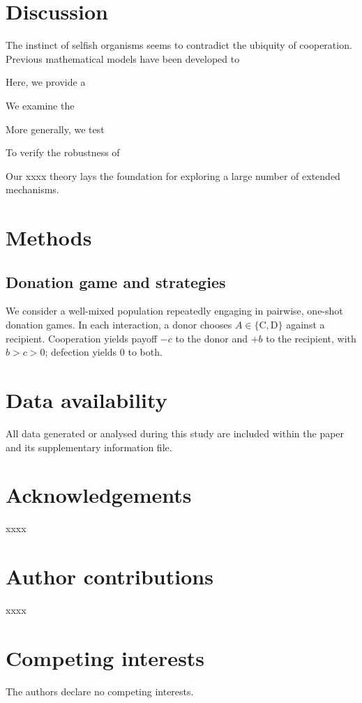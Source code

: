 \documentclass[fleqn,10pt]{wlscirep}
\begin{document}
\section*{Discussion}
The instinct of selfish organisms seems to contradict the ubiquity of cooperation. Previous mathematical models have been developed to 

Here, we provide a 

We examine the 

More generally, we test 

To verify the robustness of 

Our xxxx theory lays the foundation for exploring a large number of extended mechanisms.

\section*{Methods}

\subsection*{Donation game and strategies}
We consider a well-mixed population repeatedly engaging in pairwise, one-shot donation games.
In each interaction, a donor chooses $A\in\{\text{C},\text{D}\}$ against a recipient.
Cooperation yields payoff $-c$ to the donor and $+b$ to the recipient, with $b>c>0$; defection yields $0$ to both.




\section*{Data availability}
All data generated or analysed during this study are included within the paper and its supplementary information file. 

\section*{Acknowledgements}
xxxx

\section*{Author contributions}
xxxx

\section*{Competing interests}
The authors declare no competing interests.
\end{document}
